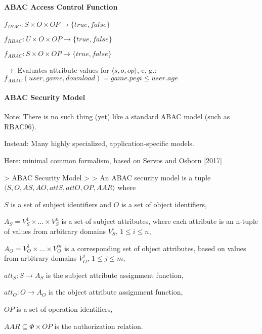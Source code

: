 \documentclass[a4paper]{article}
\begin{document}
\begin{multicols}{3}
    \paragraph{ABAC Access Control Function}
    \begin{itemize*}
        \item $f_{IBAC}:S\times O\times OP\rightarrow\{true,false\}$
        \item $f_{RBAC}:U\times O\times OP\rightarrow\{true,false\}$
        \item $f_{ABAC}:S\times O\times OP\rightarrow\{true,false\}$
        \item $\rightarrow$ Evaluates attribute values for $⟨s,o,op⟩$, e. g.: $f_{ABAC}(user,game,download)=game.pegi \leq user.age$
    \end{itemize*}

    \paragraph{ABAC Security Model}
    \begin{itemize*}
        \item Note: There is no such thing (yet) like a standard ABAC model (such as RBAC96).
        \item Instead: Many highly specialized, application-specific models.
        \item Here: minimal common formalism, based on Servos and Osborn [2017]
    \end{itemize*}

    > ABAC Security Model
    >
    > An ABAC security model is a tuple $⟨S,O,AS,AO,attS,attO,OP,AAR⟩$ where
    \begin{itemize*}
        \item $S$ is a set of subject identifiers and $O$ is a set of object identifiers,
        \item $A_S=V_S^1 \times...\times V_S^n$ is a set of subject attributes, where each attribute is an n-tuple of values from arbitrary domains $V_S^i$, $1\leq i \leq n$,
        \item $A_O=V_O^1\times...\times V_O^m$ is a corresponding set of object attributes, based on values from arbitrary domains $V_O^j$, $1\leq j \leq m$,
        \item $att_S:S\rightarrow A_S$ is the subject attribute assignment function,
        \item $att_O:O\rightarrow A_O$ is the object attribute assignment function,
        \item $OP$ is a set of operation identifiers,
        \item $AAR\subseteq \Phi\times OP$ is the authorization relation.
    \end{itemize*}


\end{multicols}
\end{document}
